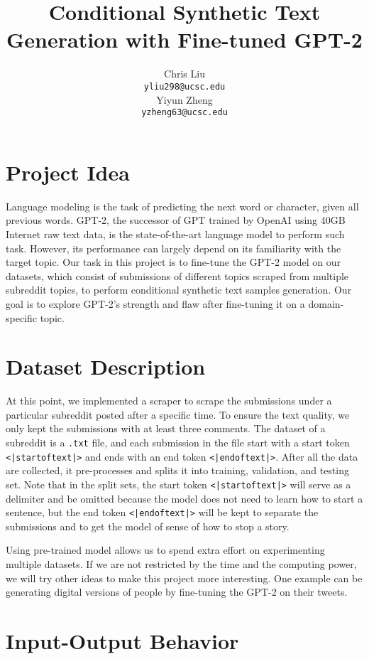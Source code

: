 \documentclass[10pt]{article}
\title{Conditional Synthetic Text Generation with Fine-tuned GPT-2}
\author{
 Chris Liu \\
    \texttt{yliu298@ucsc.edu} \\
 \And
 Yiyun Zheng \\
    \texttt{yzheng63@ucsc.edu}
}
\begin{document}
\maketitle
\section{Project Idea}

Language modeling is the task of predicting the next word or character, given all previous words. GPT-2, the successor of GPT \cite{radford2018improving} trained by OpenAI \cite{radford2019language} using 40GB Internet raw text data, is the state-of-the-art language model to perform such task. However, its performance can largely depend on its familiarity with the target topic. Our task in this project is to fine-tune the GPT-2 model on our datasets, which consist of submissions of different topics scraped from multiple subreddit topics, to perform conditional synthetic text samples generation. Our goal is to explore GPT-2's strength and flaw after fine-tuning it on a domain-specific topic.

\section{Dataset Description}

At this point, we implemented a scraper to scrape the submissions under a particular subreddit posted after a specific time. To ensure the text quality, we only kept the submissions with at least three comments. The dataset of a subreddit is a \texttt{.txt} file, and each submission in the file start with a start token \texttt{<|startoftext|>} and ends with an end token \texttt{<|endoftext|>}. After all the data are collected, it pre-processes and splits it into training, validation, and testing set. Note that in the split sets, the start token \texttt{<|startoftext|>} will serve as a delimiter and be omitted because the model does not need to learn how to start a sentence, but the end token \texttt{<|endoftext|>} will be kept to separate the submissions and to get the model of sense of how to stop a story.

Using pre-trained model allows us to spend extra effort on experimenting multiple datasets. If we are not restricted by the time and the computing power, we will try other ideas to make this project more interesting. One example can be generating digital versions of people by fine-tuning the GPT-2 on their tweets.

\section{Input-Output Behavior}
\end{document}
